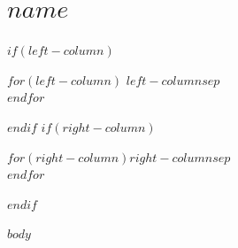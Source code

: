\documentclass[$if(fontsize)$$fontsize$$else$10pt$endif$,letterpaper]{article}
\def\name{$name$}
\begin{document}
{\section{\huge\rmfamily\scshape\itshape \name}}

\bigskip

{
$if(left-column)$
\begin{minipage}[t]{0.495\textwidth}
  $for(left-column)$
    $left-column$$sep$ \\
  $endfor$
\end{minipage} %
$endif$
$if(right-column)$
\begin{minipage}[t]{0.495\textwidth}
  $for(right-column)$$right-column$$sep$ \\ $endfor$
\end{minipage}
$endif$


\bigskip

$body$
}
\end{document}
